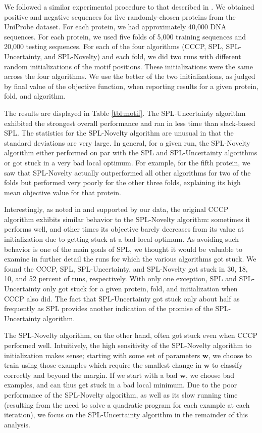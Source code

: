 \documentclass{article}
\begin{document}
We followed a similar experimental procedure to that described in \cite{SPL}. We obtained positive and negative sequences for five randomly-chosen proteins from the UniProbe dataset. For each protein, we had approximately 40,000 DNA sequences. For each protein, we used five folds of 5,000 training sequences and 20,000 testing sequences. For each of the four algorithms (CCCP, SPL, SPL-Uncertainty, and SPL-Novelty) and each fold, we did two runs with different random initializations of the motif positions. These initializations were the same across the four algorithms. We use the better of the two initializations, as judged by final value of the objective function, when reporting results for a given protein, fold, and algorithm. 

The results are displayed in Table \ref{tbl:motif}. The SPL-Uncertainty algorithm exhibited the strongest overall performance and ran in less time than slack-based SPL. The statistics for the SPL-Novelty algorithm are unusual in that the standard deviations are very large. In general, for a given run, the SPL-Novelty algorithm either performed on par with the SPL and SPL-Uncertainty algorithms or got stuck in a very bad local optimum. For example, for the fifth protein, we saw that SPL-Novelty actually outperformed all other algorithms for two of the folds but performed very poorly for the other three folds, explaining its high mean objective value for that protein. 

Interestingly, as noted in \cite{SPL} and supported by our data, the original CCCP algorithm exhibits similar behavior to the SPL-Novelty algorithm: sometimes it performs well, and other times its objective barely decreases from its value at initialization due to getting stuck at a bad local optimum. As avoiding such behavior is one of the main goals of SPL, we thought it would be valuable to examine in further detail the runs for which the various algorithms got stuck. We found the CCCP, SPL, SPL-Uncertainty, and SPL-Novelty got stuck in 30, 18, 10, and 52 percent of runs, respectively. With only one exception, SPL and SPL-Uncertainty only got stuck for a given protein, fold, and initialization when CCCP also did. The fact that SPL-Uncertainty got stuck only about half as frequently as SPL provides another indication of the promise of the SPL-Uncertainty algorithm. 

The SPL-Novelty algorithm, on the other hand, often got stuck even when CCCP performed well. Intuitively, the high sensitivity of the SPL-Novelty algorithm to initialization makes sense; starting with some set of parameters $\textbf{w}$, we choose to train using those examples which require the smallest change in $\textbf{w}$ to classify correctly and beyond the margin. If we start with a bad $\textbf{w}$, we choose bad examples, and can thus get stuck in a bad local minimum. Due to the poor performance of the SPL-Novelty algorithm, as well as its slow running time (resulting from the need to solve a quadratic program for each example at each iteration), we focus on the SPL-Uncertainty algorithm in the remainder of this analysis.
\end{document}
